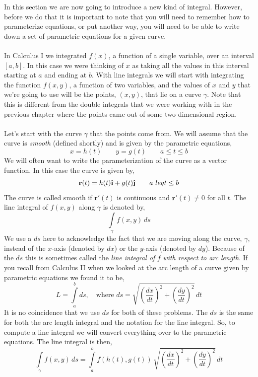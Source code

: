 \documentclass[10pt,reqno]{book}
\theoremstyle{definition}
\renewcommand{\vec}[1]{\mathbf{#1}}
\newcommand{\uvec}[1]{\boldsymbol{\hat{\textbf{#1}}}}
\begin{document}
	In this section we are now going to introduce a new kind of integral. However, before we do that it is important to note that you will need to remember how to parameterize equations, or put another way, you will need to be able to write down a set of parametric equations for a given curve.\\ \\
	In Calculus I we integrated $ f(x) $, a function of a single variable, over an interval $ [a,b] $.  In this case we were thinking of $ x $ as taking all the values in this interval starting at $ a $ and ending at $ b $. With line integrals we will start with integrating the function $ f(x,y) $, a function of two variables, and the values of $ x $ and $ y $ that we're going to use will be the points, $ (x,y) $, that lie on a curve $ \gamma $. Note that this is different from the double integrals that we were working with in the previous chapter where the points came out of some two-dimensional region.\\ \\
	Let's start with the curve $ \gamma $ that the points come from. We will assume that the curve is \textit{smooth} (defined shortly) and is given by the parametric equations,
	\[ x = h(t) \qquad y = g(t) \qquad a \leq t \leq b \]
	We will often want to write the parameterization of the curve as a vector function. In this case the curve is given by, 
	\[ \vec{r}(t) = h(t)\uvec{\i} + g(t)\uvec{\j} \qquad a\ leq t \leq b \]
	The curve is called smooth if $ \vec{r}'(t) $ is continuous and $ \vec{r}'(t) \neq 0 $ for all $ t $. The line integral of $ f(x,y) $ along $ \gamma $ is denoted by,
	\[ \int\limits_{\gamma} f(x,y)\,ds \]
	We use a $ ds $ here to acknowledge the fact that we are moving along the curve, $ \gamma $, instead of the $ x $-axis (denoted by $ dx $) or the $ y $-axis (denoted by $ dy $). Because of the $ ds $ this is sometimes called the \textit{line integral of} $ f $ \textit{with respect to arc length}. If you recall from Calculus II when we looked at the arc length of a curve given by parametric equations we found it to be,
	\[ L = \int\limits_a^b ds, \quad \text{where } ds = \sqrt{\left( \frac{dx}{dt} \right)^2 + \left( \frac{dy}{dt} \right)^2 }\,dt \]
	It is no coincidence that we use $ ds $ for both of these problems. The $ ds $ is the same for both the arc length integral and the notation for the line integral. So, to compute a line integral we will convert everything over to the parametric equations. The line integral is then,
	\[ \int\limits_{\gamma} f(x,y)\,ds = \int\limits_a^b f(h(t),g(t))\,\sqrt{\left( \frac{dx}{dt} \right)^2 + \left( \frac{dy}{dt} \right)^2 }\,dt  \]
\end{document}
